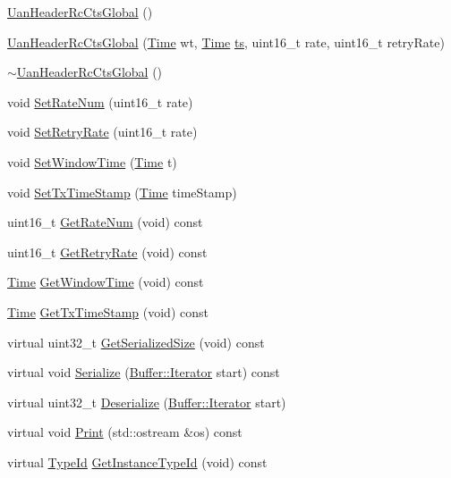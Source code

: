 \begin{DoxyCompactItemize}
\item 
\hyperlink{classns3_1_1UanHeaderRcCtsGlobal_a1c8d269033df41571ef1a938731c86af}{Uan\+Header\+Rc\+Cts\+Global} ()
\item 
\hyperlink{classns3_1_1UanHeaderRcCtsGlobal_a6e577ebdd585053b9efea9d930792e4e}{Uan\+Header\+Rc\+Cts\+Global} (\hyperlink{classns3_1_1Time}{Time} wt, \hyperlink{classns3_1_1Time}{Time} \hyperlink{mmwave_2model_2fading-traces_2fading__trace__generator_8m_ada841f58d7be618bfbc76c87e7d44086}{ts}, uint16\+\_\+t rate, uint16\+\_\+t retry\+Rate)
\item 
\hyperlink{classns3_1_1UanHeaderRcCtsGlobal_aec3ee4e3bf3d1332d23b8c151e797591}{$\sim$\+Uan\+Header\+Rc\+Cts\+Global} ()
\item 
void \hyperlink{classns3_1_1UanHeaderRcCtsGlobal_a59844e6d4c5b301e66618bc8db19272b}{Set\+Rate\+Num} (uint16\+\_\+t rate)
\item 
void \hyperlink{classns3_1_1UanHeaderRcCtsGlobal_a7d024e9d39b4f622303181f74c372c81}{Set\+Retry\+Rate} (uint16\+\_\+t rate)
\item 
void \hyperlink{classns3_1_1UanHeaderRcCtsGlobal_acfa71db65bd6e0ad8e46fddec4bb8fcf}{Set\+Window\+Time} (\hyperlink{classns3_1_1Time}{Time} t)
\item 
void \hyperlink{classns3_1_1UanHeaderRcCtsGlobal_a9047f3c6b68302fcb1543df4c3034ded}{Set\+Tx\+Time\+Stamp} (\hyperlink{classns3_1_1Time}{Time} time\+Stamp)
\item 
uint16\+\_\+t \hyperlink{classns3_1_1UanHeaderRcCtsGlobal_afe31cff6e0855629d05a5fca609b1fca}{Get\+Rate\+Num} (void) const 
\item 
uint16\+\_\+t \hyperlink{classns3_1_1UanHeaderRcCtsGlobal_ac05f8cb8453f04cab97900c1bad228d0}{Get\+Retry\+Rate} (void) const 
\item 
\hyperlink{classns3_1_1Time}{Time} \hyperlink{classns3_1_1UanHeaderRcCtsGlobal_a2ada3dfe595168956d38fcab51407f34}{Get\+Window\+Time} (void) const 
\item 
\hyperlink{classns3_1_1Time}{Time} \hyperlink{classns3_1_1UanHeaderRcCtsGlobal_a378af893f7a2abf88eafa5019481ef7c}{Get\+Tx\+Time\+Stamp} (void) const 
\item 
virtual uint32\+\_\+t \hyperlink{classns3_1_1UanHeaderRcCtsGlobal_a4468077e03aaadaae3feac853c87e42c}{Get\+Serialized\+Size} (void) const 
\item 
virtual void \hyperlink{classns3_1_1UanHeaderRcCtsGlobal_ac17082aeb149e043542a9f93d241b66d}{Serialize} (\hyperlink{classns3_1_1Buffer_1_1Iterator}{Buffer\+::\+Iterator} start) const 
\item 
virtual uint32\+\_\+t \hyperlink{classns3_1_1UanHeaderRcCtsGlobal_ae92bdd34a2b3f45adb415908d46084e3}{Deserialize} (\hyperlink{classns3_1_1Buffer_1_1Iterator}{Buffer\+::\+Iterator} start)
\item 
virtual void \hyperlink{classns3_1_1UanHeaderRcCtsGlobal_a7248aa9cbc4909209a06d9a9d37e2509}{Print} (std\+::ostream \&os) const 
\item 
virtual \hyperlink{classns3_1_1TypeId}{Type\+Id} \hyperlink{classns3_1_1UanHeaderRcCtsGlobal_a23c58ae06b8ddab9c8539be6d42f527d}{Get\+Instance\+Type\+Id} (void) const 
\end{DoxyCompactItemize}
